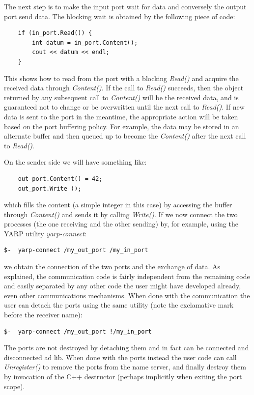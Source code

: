 The next step is to make the input port wait for data and conversely the output port send
data. The blocking wait is obtained by the following piece of code:
%
\begin{verbatim}
    if (in_port.Read()) {
        int datum = in_port.Content();
        cout << datum << endl;
    }
\end{verbatim}
%
\noindent 
This shows how to read from the port with a blocking {\em Read()} and
acquire the received data through {\em Content()}. If the call to {\em
Read()} succeeds, then the object returned by any subsequent call to
{\em Content()} will be the received data, and is guaranteed not to
change or be overwritten until the next call to {\em Read()}.
If new data is sent to the port in the meantime, the appropriate
action will be taken based on the port buffering policy.  For example,
the data may be stored in an alternate buffer and then queued up to 
become the {\em Content()} after the next call to {\em Read()}.

On the sender side we will have something 
like:
%
\begin{verbatim}
    out_port.Content() = 42;
    out_port.Write ();
\end{verbatim}
%
\noindent which fills the content (a simple integer in this case) by
accessing the buffer through {\em Content()} and sends it by calling
{\em Write()}.
%
%
If we now connect the two processes (the one receiving
and the other sending) by, for example, using the YARP utility {\em yarp-connect}:

\begin{verbatim}
$-  yarp-connect /my_out_port /my_in_port    
\end{verbatim}

\noindent we obtain the connection of the two ports and the exchange of data. As explained,
the communication code is fairly independent from the remaining code and easily separated
by any other code the user might have developed already, even other communications 
mechanisms. When done with the communication the user can detach the ports using the same
utility (note the exclamative mark before the receiver name):

\begin{verbatim}
$-  yarp-connect /my_out_port !/my_in_port 
\end{verbatim}

The ports are not destroyed by detaching them and in fact can be connected and disconnected
ad lib. When done with the ports instead the user code can call {\em Unregister()} to 
remove the ports from the name server, and finally destroy them by invocation of the C++
destructor (perhaps implicitly when exiting the port scope).

